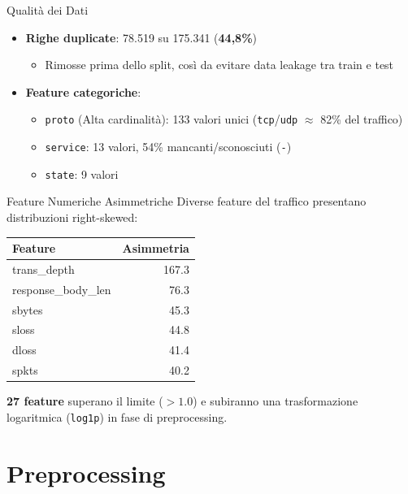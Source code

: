 \documentclass{beamer}
\begin{document}
\begin{frame}{Qualità dei Dati}
  \begin{itemize}
    \item \textbf{Righe duplicate}: 78.519 su 175.341 (\textbf{44,8\%})
      \begin{itemize}
        \item Rimosse prima dello split, così da evitare data leakage tra train e test
      \end{itemize}
    \vspace{0.3cm}
    \item \textbf{Feature categoriche}:
      \begin{itemize}
        \item \texttt{proto} (Alta cardinalità): 133 valori unici (\texttt{tcp}/\texttt{udp}
          $\approx$ 82\% del traffico)
        \item \texttt{service}: 13 valori, 54\% mancanti/sconosciuti (\texttt{-})
        \item \texttt{state}: 9 valori
      \end{itemize}
  \end{itemize}
\end{frame}

\begin{frame}{Feature Numeriche Asimmetriche}
  Diverse feature del traffico presentano distribuzioni right-skewed:
  \begin{center}
    \begin{tabular}{lr}
      \toprule
      \textbf{Feature} & \textbf{Asimmetria} \\
      \midrule
      trans\_depth & 167.3 \\
      response\_body\_len & 76.3 \\
      sbytes & 45.3 \\
      sloss & 44.8 \\
      dloss & 41.4 \\
      spkts & 40.2 \\
      \bottomrule
    \end{tabular}
  \end{center}
  \vspace{0.3cm}
  \textbf{27 feature} superano il limite ($> 1.0$) e subiranno una trasformazione logaritmica (\texttt{log1p}) in fase di preprocessing.
\end{frame}

\section{Preprocessing}
\end{document}
